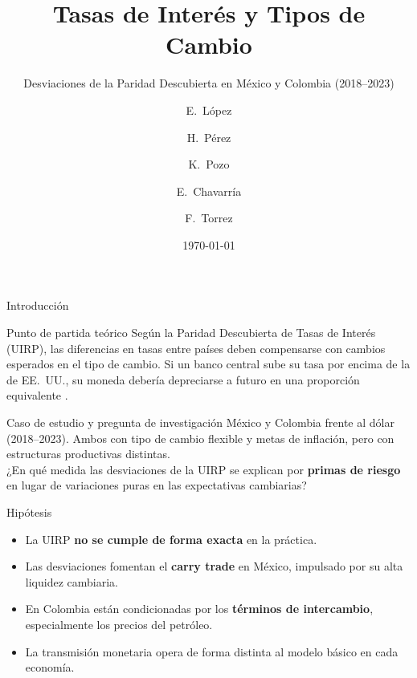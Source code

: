 \documentclass[10pt,professionalfonts,aspectratio=169]{beamer}
\title[Tasas de Interés y Tipo de Cambio]{Tasas de Interés y Tipos de Cambio}
\subtitle{Desviaciones de la Paridad Descubierta en México y Colombia (2018--2023)}
\author[Grupo 4]{E.~López \and H.~Pérez \and K.~Pozo \and E.~Chavarría \and F.~Torrez}
\institute[UNI-DACIP]{Grupo 4 \\ Economía Internacional Real \\ Universidad Nacional de Ingeniería (UNI) --- DACIP}
\date[\,]{\today}
\begin{document}
\begin{frame}[plain]
    \titlepage
\end{frame}

\begin{frame}{Introducción}
    \begin{block}{Punto de partida teórico}
        Según la Paridad Descubierta de Tasas de Interés (UIRP), las diferencias en tasas entre países deben compensarse con cambios esperados en el tipo de cambio. Si un banco central sube su tasa por encima de la de EE.~UU., su moneda debería depreciarse a futuro en una proporción equivalente \parencite{krugman2012}.
    \end{block}

    \begin{block}{Caso de estudio y pregunta de investigación}
        México y Colombia frente al dólar (2018--2023). Ambos con tipo de cambio flexible y metas de inflación, pero con estructuras productivas distintas. \\
         ¿En qué medida las desviaciones de la UIRP se explican por \textbf{primas de riesgo} en lugar de variaciones puras en las expectativas cambiarias?
    \end{block}
    
\end{frame}

\begin{frame}{Hipótesis}
    \begin{itemize}
        \item La UIRP \textbf{no se cumple de forma exacta} en la práctica.
        \item Las desviaciones fomentan el \textbf{carry trade} en México, impulsado por su alta liquidez cambiaria.
        \item En Colombia están condicionadas por los \textbf{términos de intercambio}, especialmente los precios del petróleo.
        \item La transmisión monetaria opera de forma distinta al modelo básico en cada economía.
    \end{itemize}
\end{frame}
\end{document}
